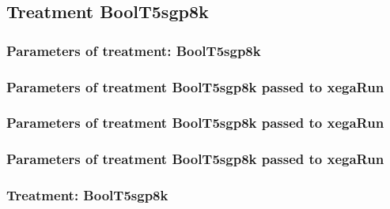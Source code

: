 \documentclass[18pt,c]{beamer}
\begin{document}
\clearpage
\subsection{Treatment BoolT5sgp8k}

 \begin{frame}
 \fontsize{8pt}{9pt}\selectfont
 \frametitle{  Parameters of treatment: BoolT5sgp8k 
 }

 \label{ExpFtParmTable036.tex}  
 \end{frame}


 \begin{frame}
 \fontsize{8pt}{9pt}\selectfont
 \frametitle{  Parameters of treatment BoolT5sgp8k passed to xegaRun
 }

 \label{ExpFtParmTable037.tex}  
 \end{frame}


 \begin{frame}
 \fontsize{8pt}{9pt}\selectfont
 \frametitle{  Parameters of treatment BoolT5sgp8k passed to xegaRun
 }

 \label{ExpFtParmTable038.tex}  
 \end{frame}


 \begin{frame}
 \fontsize{8pt}{9pt}\selectfont
 \frametitle{  Parameters of treatment BoolT5sgp8k passed to xegaRun
 }

 \label{ExpFtParmTable039.tex}  
 \end{frame}

 \begin{frame}
 \fontsize{8pt}{9pt}\selectfont
 \frametitle{ Treatment: BoolT5sgp8k }

 \label{ExpFStatsTable012.tex}  
 \end{frame}
\end{document}

